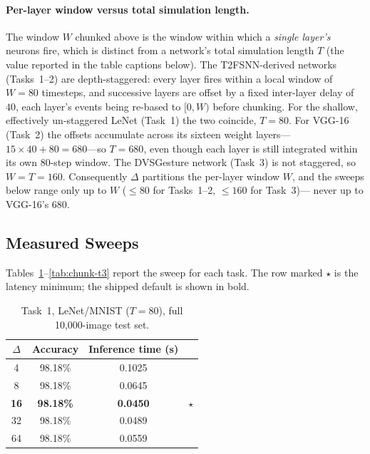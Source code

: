 \documentclass[runningheads]{llncs}
\begin{document}
\paragraph{Per-layer window versus total simulation length.}
The window $W$ chunked above is the window within which a \emph{single layer's}
neurons fire, which is distinct from a network's total simulation length $T$ (the
value reported in the table captions below). The T2FSNN-derived networks
(Tasks~1--2) are depth-staggered: every layer fires within a local window of $W=80$
timesteps, and successive layers are offset by a fixed inter-layer delay of $40$,
each layer's events being re-based to $[0,W)$ before chunking. For the shallow,
effectively un-staggered LeNet (Task~1) the two coincide, $T=80$. For VGG-16
(Task~2) the offsets accumulate across its sixteen weight layers---%
$15\times 40 + 80 = 680$---so $T=680$, even though each layer is still integrated
within its own $80$-step window. The DVSGesture network (Task~3) is not staggered,
so $W=T=160$. Consequently $\Delta$ partitions the per-layer window $W$, and the
sweeps below range only up to $W$ ($\le 80$ for Tasks~1--2, $\le 160$ for Task~3)---%
never up to VGG-16's $680$.

\subsection{Measured Sweeps}\label{app:chunk-data}

Tables~\ref{tab:chunk-t1}--\ref{tab:chunk-t3} report the sweep for each task. The
row marked $\star$ is the latency minimum; the shipped default is shown in bold.

\begin{table}[t]
\centering
\caption{Task~1, LeNet/MNIST ($T=80$), full 10{,}000-image test set.}
\label{tab:chunk-t1}
\begin{tabular}{cccc}
\toprule
$\Delta$ & Accuracy & Inference time (s) & \\
\midrule
4  & 98.18\% & 0.1025 & \\
8  & 98.18\% & 0.0645 & \\
\textbf{16} & \textbf{98.18\%} & \textbf{0.0450} & $\star$ \\
32 & 98.18\% & 0.0489 & \\
64 & 98.18\% & 0.0559 & \\
\bottomrule
\end{tabular}
\end{table}
\end{document}
